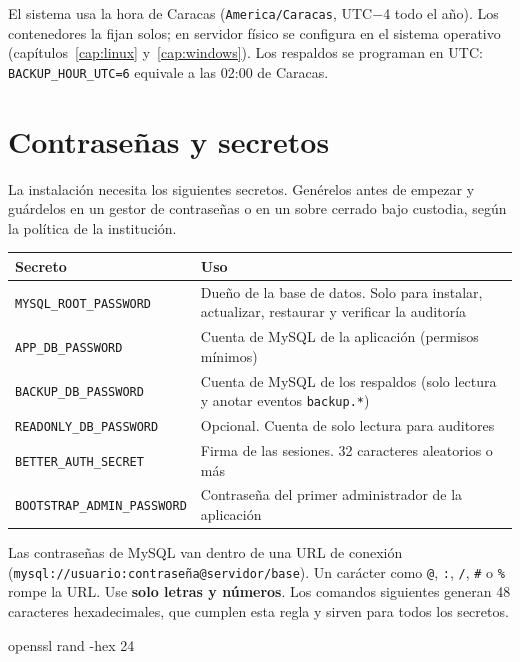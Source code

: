 El sistema usa la hora de Caracas (\texttt{America/Caracas}, UTC$-$4 todo el año). Los
contenedores la fijan solos; en servidor físico se configura en el sistema operativo
(capítulos~\ref{cap:linux} y~\ref{cap:windows}). Los respaldos se programan en UTC:
\texttt{BACKUP\_HOUR\_UTC=6} equivale a las 02:00 de Caracas.

\section{Contraseñas y secretos}
\label{sec:secretos}

La instalación necesita los siguientes secretos. Genérelos antes de empezar y guárdelos en un
gestor de contraseñas o en un sobre cerrado bajo custodia, según la política de la institución.

\begin{xltabular}{\linewidth}{@{}l L@{}}
	\toprule
	\textbf{Secreto} & \textbf{Uso} \\
	\midrule
	\endhead
	\texttt{MYSQL\_ROOT\_PASSWORD} & Dueño de la base de datos. Solo para instalar, actualizar,
	restaurar y verificar la auditoría \\
	\texttt{APP\_DB\_PASSWORD} & Cuenta de MySQL de la aplicación (permisos mínimos) \\
	\texttt{BACKUP\_DB\_PASSWORD} & Cuenta de MySQL de los respaldos (solo lectura y anotar
	eventos \texttt{backup.*}) \\
	\texttt{READONLY\_DB\_PASSWORD} & Opcional. Cuenta de solo lectura para auditores \\
	\texttt{BETTER\_AUTH\_SECRET} & Firma de las sesiones. 32 caracteres aleatorios o más \\
	\texttt{BOOTSTRAP\_ADMIN\_PASSWORD} & Contraseña del primer administrador de la
	aplicación \\
	\bottomrule
\end{xltabular}

\begin{aviso}
	Las contraseñas de MySQL van dentro de una URL de conexión
	(\texttt{mysql://usuario:contraseña@servidor/base}). Un carácter como \texttt{@}, \texttt{:},
	\texttt{/}, \texttt{\#} o \texttt{\%} rompe la URL. Use \textbf{solo letras y números}. Los
	comandos siguientes generan 48 caracteres hexadecimales, que cumplen esta regla y sirven para
	todos los secretos.
\end{aviso}

\begin{codigo}
openssl rand -hex 24
\end{codigo}

